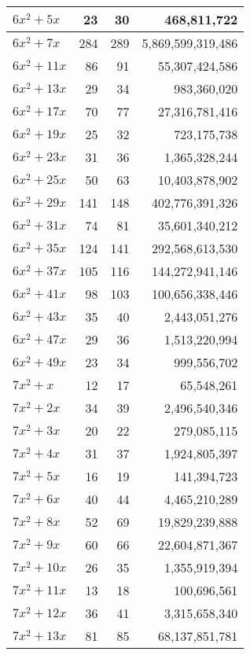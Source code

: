 \documentclass[a4paper]{amsproc}
\theoremstyle{plain}
\begin{document}
\begin{longtable}{ | l | r | r | r | }
$6x^2 + 5x$ & 23 & 30 & 468{,}811{,}722 \\ \hline
$6x^2 + 7x$ & 284 & 289 & 5{,}869{,}599{,}319{,}486 \\ \hline
$6x^2 + 11x$ & 86 & 91 & 55{,}307{,}424{,}586 \\ \hline
$6x^2 + 13x$ & 29 & 34 & 983{,}360{,}020 \\ \hline
$6x^2 + 17x$ & 70 & 77 & 27{,}316{,}781{,}416 \\ \hline
$6x^2 + 19x$ & 25 & 32 & 723{,}175{,}738 \\ \hline
$6x^2 + 23x$ & 31 & 36 & 1{,}365{,}328{,}244 \\ \hline
$6x^2 + 25x$ & 50 & 63 & 10{,}403{,}878{,}902 \\ \hline
$6x^2 + 29x$ & 141 & 148 & 402{,}776{,}391{,}326 \\ \hline
$6x^2 + 31x$ & 74 & 81 & 35{,}601{,}340{,}212 \\ \hline
$6x^2 + 35x$ & 124 & 141 & 292{,}568{,}613{,}530 \\ \hline
$6x^2 + 37x$ & 105 & 116 & 144{,}272{,}941{,}146 \\ \hline
$6x^2 + 41x$ & 98 & 103 & 100{,}656{,}338{,}446 \\ \hline
$6x^2 + 43x$ & 35 & 40 & 2{,}443{,}051{,}276 \\ \hline
$6x^2 + 47x$ & 29 & 36 & 1{,}513{,}220{,}994 \\ \hline
$6x^2 + 49x$ & 23 & 34 & 999{,}556{,}702 \\ \hline
$7x^2 + x$ & 12 & 17 & 65{,}548{,}261 \\ \hline
$7x^2 + 2x$ & 34 & 39 & 2{,}496{,}540{,}346 \\ \hline
$7x^2 + 3x$ & 20 & 22 & 279{,}085{,}115 \\ \hline
$7x^2 + 4x$ & 31 & 37 & 1{,}924{,}805{,}397 \\ \hline
$7x^2 + 5x$ & 16 & 19 & 141{,}394{,}723 \\ \hline
$7x^2 + 6x$ & 40 & 44 & 4{,}465{,}210{,}289 \\ \hline
$7x^2 + 8x$ & 52 & 69 & 19{,}829{,}239{,}888 \\ \hline
$7x^2 + 9x$ & 60 & 66 & 22{,}604{,}871{,}367 \\ \hline
$7x^2 + 10x$ & 26 & 35 & 1{,}355{,}919{,}394 \\ \hline
$7x^2 + 11x$ & 13 & 18 & 100{,}696{,}561 \\ \hline
$7x^2 + 12x$ & 36 & 41 & 3{,}315{,}658{,}340 \\ \hline
$7x^2 + 13x$ & 81 & 85 & 68{,}137{,}851{,}781 \\ \hline

\end{longtable}
\end{document}
